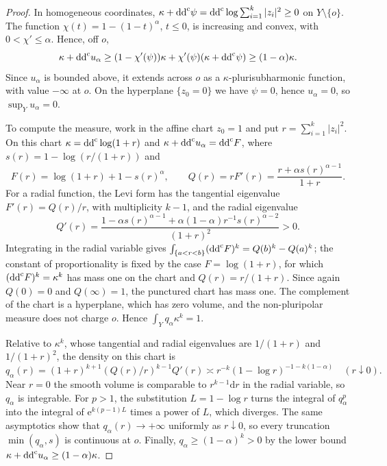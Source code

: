 \begin{proof}
In homogeneous coordinates, $\kappa+\mathrm{dd}^{\mathrm{c}}\psi=\mathrm{dd}^{\mathrm{c}}\log\sum_{i=1}^k|z_i|^2\geq0$ on $Y\setminus\{o\}$. The function $\chi(t)=1-(1-t)^\alpha$, $t\leq0$, is increasing and convex, with $0<\chi'\leq\alpha$. Hence, off $o$,
\[
 \kappa+\mathrm{dd}^{\mathrm{c}} u_\alpha\geq(1-\chi'(\psi))\kappa+\chi'(\psi)(\kappa+\mathrm{dd}^{\mathrm{c}}\psi)
 \geq(1-\alpha)\kappa.
\]
Since $u_\alpha$ is bounded above, it extends across $o$ as a $\kappa$-plurisubharmonic function, with value $-\infty$ at $o$. On the hyperplane $\{z_0=0\}$ we have $\psi=0$, hence $u_\alpha=0$, so $\sup_Yu_\alpha=0$.

To compute the measure, work in the affine chart $z_0=1$ and put $r=\sum_{i=1}^k|z_i|^2$. On this chart $\kappa=\mathrm{dd}^{\mathrm{c}}\log(1+r)$ and $\kappa+\mathrm{dd}^{\mathrm{c}} u_\alpha=\mathrm{dd}^{\mathrm{c}} F$, where $s(r)=1-\log(r/(1+r))$ and
\[
 F(r)=\log(1+r)+1-s(r)^\alpha,\qquad
 Q(r)=rF'(r)=\frac{r+\alpha s(r)^{\alpha-1}}{1+r}.
\]
For a radial function, the Levi form has the tangential eigenvalue $F'(r)=Q(r)/r$, with multiplicity $k-1$, and the radial eigenvalue
\[
 Q'(r)=\frac{1-\alpha s(r)^{\alpha-1}+\alpha(1-\alpha)r^{-1}s(r)^{\alpha-2}}{(1+r)^2}>0.
\]
Integrating in the radial variable gives $\int_{\{a<r<b\}}(\mathrm{dd}^{\mathrm{c}} F)^k=Q(b)^k-Q(a)^k$; the constant of proportionality is fixed by the case $F=\log(1+r)$, for which $(\mathrm{dd}^{\mathrm{c}} F)^k=\kappa^k$ has mass one on the chart and $Q(r)=r/(1+r)$. Since again $Q(0)=0$ and $Q(\infty)=1$, the punctured chart has mass one. The complement of the chart is a hyperplane, which has zero volume, and the non-pluripolar measure does not charge $o$. Hence $\int_Yq_\alpha\kappa^k=1$.

Relative to $\kappa^k$, whose tangential and radial eigenvalues are $1/(1+r)$ and $1/(1+r)^2$, the density on this chart is
\[
 q_\alpha(r)=(1+r)^{k+1}(Q(r)/r)^{k-1}Q'(r)
 \asymp r^{-k}(1-\log r)^{-1-k(1-\alpha)}\quad(r\downarrow0).
\]
Near $r=0$ the smooth volume is comparable to $r^{k-1}\mathrm{d}r$ in the radial variable, so $q_\alpha$ is integrable. For $p>1$, the substitution $L=1-\log r$ turns the integral of $q_\alpha^p$ into the integral of $\mathrm{e}^{k(p-1)L}$ times a power of $L$, which diverges. The same asymptotics show that $q_\alpha(r)\to+\infty$ uniformly as $r\downarrow0$, so every truncation $\min(q_\alpha,s)$ is continuous at $o$. Finally, $q_\alpha\geq(1-\alpha)^k>0$ by the lower bound $\kappa+\mathrm{dd}^{\mathrm{c}} u_\alpha\geq(1-\alpha)\kappa$.
\end{proof}

